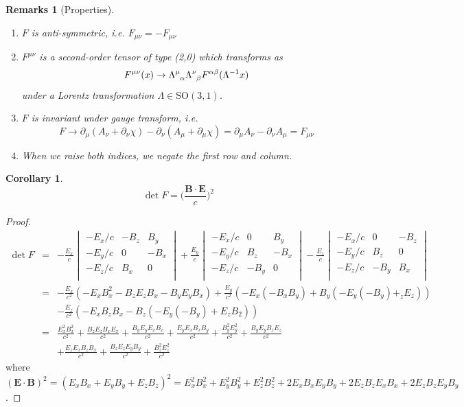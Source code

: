 \documentclass[a4paper]{article}
\newtheorem{remarks}{Remarks}[section]
\theoremstyle{new}
\newtheorem{cor}{Corollary}[section]
\begin{document}
\begin{remarks}[Properties]\leavevmode
\begin{enumerate}
    \item $F$ is anti-symmetric, i.e. $F_{\mu\nu}=-F_{\mu\nu}$
    \item $F^{\mu\nu}$ is a second-order tensor of type (2,0) which transforms as
$$F^{\mu\nu}(x)\rightarrow\tensor*{\Lambda}{*_{}^{\mu}_{\alpha}}\tensor*{\Lambda}{*_{}^{\nu}_{\beta}}F^{\alpha\beta}(\Lambda^{-1}x)$$
under a Lorentz transformation $\Lambda\in\text{SO}(3,1)$.
\item $F$ is invariant under gauge transform, i.e.
$$F\rightarrow \partial_\mu(A_\nu+\partial_\nu\chi)-\partial_\nu(A_\mu+\partial_\mu\chi)=\partial_\mu A_\nu-\partial_\nu A_\mu=F_{\mu\nu}$$
\item When we raise both indices, we negate the first row and column.
\end{enumerate}
\end{remarks}
\begin{cor}
$$\det F=\bigg(\frac{\mathbf{B}\cdot\mathbf{E}}{c}\bigg)^2$$
\end{cor}
\begin{proof}
\begin{eqnarray}
    \det F&=&-\frac{E_x}{c}\begin{vmatrix}-E_x/c&-B_z&B_y\\-E_y/c&0&-B_x\\-E_z/c&B_x&0\\\end{vmatrix}+\frac{E_y}{c}\begin{vmatrix}-E_x/c&0&B_y\\-E_y/c&B_z&-B_x\\-E_z/c&-B_y&0\\\end{vmatrix}-\frac{E_z}{c}\begin{vmatrix}-E_x/c&0&-B_z\\-E_y/c&B_z&0\\-E_z/c&-B_y&B_x\\\end{vmatrix}\nonumber\\&=&-\frac{E_x}{c^2}(-E_xB_x^2-B_zE_zB_x-B_yE_yB_x)+\frac{E_y}{c^2}(-E_x(-B_xB_y)+B_y(-E_y(-B_y)+_zE_z))\nonumber\\&&-\frac{E_z}{c^2}(-E_xB_zB_x-B_z(-E_y(-B_y)+E_zB_2))\nonumber\\&=&\frac{E_x^2B_x^2}{c^2}+\frac{B_zE_zB_xE_x}{c^2}+\frac{B_yE_yE_xB_x}{c^2}+\frac{E_yE_xB_xB_y}{c^2}+\frac{B_y^2E_y^2}{c^2}+\frac{B_yE_yB_zE_z}{c^2}\nonumber\\&&+\frac{E_zE_xB_zB_x}{c^2}+\frac{B_zE_zE_yB_y}{c^2}+\frac{B_z^2E_z^2}{c^2}\nonumber
\end{eqnarray}
where $(\mathbf{E}\cdot\mathbf{B})^2=(E_xB_x+E_yB_y+E_zB_z)^2=E_x^2B_x^2+E_y^2B_y^2+E_z^2B_z^2+2E_xB_xE_yB_y+2E_zB_zE_xB_x+2E_zB_zE_yB_y$.
\end{proof}
\end{document}
